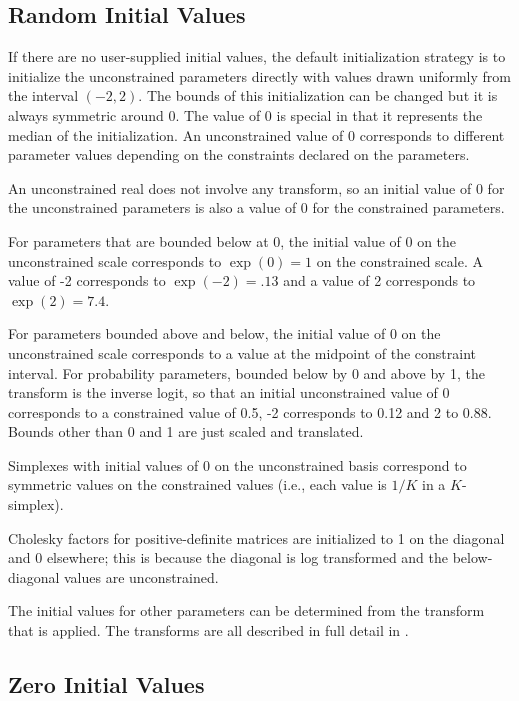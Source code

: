 \subsection{Random Initial Values}

If there are no user-supplied initial values, the default
initialization strategy is to initialize the unconstrained parameters
directly with values drawn uniformly from the interval $(-2,2)$.  The
bounds of this initialization can be changed but it is always
symmetric around 0. The value of 0 is special in that it represents
the median of the initialization.  An unconstrained value of 0
corresponds to different parameter values depending on the constraints
declared on the parameters.

An unconstrained real does not involve any transform, so an initial
value of 0 for the unconstrained parameters is also a value of 0 for
the constrained parameters.

For parameters that are bounded below at 0, the initial value of 0 on
the unconstrained scale corresponds to $\exp(0) = 1$ on the
constrained scale.  A value of -2 corresponds to $\exp(-2) = .13$ and
a value of 2 corresponds to $\exp(2) = 7.4$.

For parameters bounded above and below, the initial value of 0 on the
unconstrained scale corresponds to a value at the midpoint of the
constraint interval.  For probability parameters, bounded below by 0
and above by 1, the transform is the inverse logit, so that an initial
unconstrained value of 0 corresponds to a constrained value of 0.5, -2
corresponds to 0.12 and 2 to 0.88.  Bounds other than 0 and 1 are
just scaled and translated.

Simplexes with initial values of 0 on the unconstrained basis
correspond to symmetric values on the constrained values (i.e., each
value is $1/K$ in a $K$-simplex).

Cholesky factors for positive-definite matrices are initialized to 1
on the diagonal and 0 elsewhere;  this is because the diagonal is log
transformed and the below-diagonal values are unconstrained.

The initial values for other parameters can be determined from the
transform that is applied.  The transforms are all described in full
detail in .

\subsection{Zero Initial Values}

